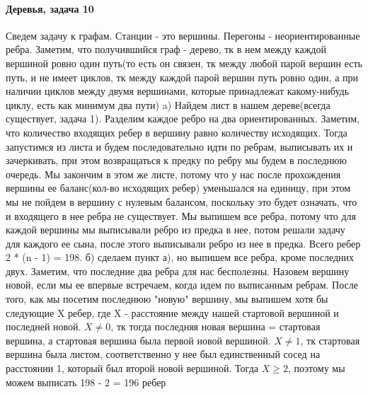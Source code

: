 \documentclass{article}
\begin{document}
	\paragraph{Деревья, задача 10}
	\hspace{\fill} \newline
	Сведем задачу к графам. Станции - это вершины. Перегоны - неориентированные ребра. Заметим, что получившийся граф - дерево, тк в нем между каждой вершиной ровно один путь(то есть он связен, тк между любой парой вершин есть путь, и не имеет циклов, тк между каждой парой вершин путь ровно один, а при наличии циклов между двумя вершинами, которые принадлежат какому-нибудь циклу, есть как минимум два пути)
	\newline
	a) Найдем лист в нашем дереве(всегда существует, задача 1). Разделим каждое ребро на два ориентированных. Заметим, что количество входящих ребер в вершину равно количеству исходящих. Тогда запустимся из листа и будем последовательно идти по ребрам, выписывать их и зачеркивать, при этом возвращаться к предку по ребру мы будем в последнюю очередь. Мы закончим в этом же листе, потому что у нас после прохождения вершины ее баланс(кол-во исходящих ребер) уменьшался на единицу, при этом мы не пойдем в вершину с нулевым балансом, поскольку это будет означать, что и входящего в нее ребра не существует. Мы выпишем все ребра, потому что для каждой вершины мы выписывали ребро из предка в нее, потом решали задачу для каждого ее сына, после этого выписывали ребро из нее в предка. Всего ребер 2 * (n - 1) = 198.
	\newline
	б) сделаем пункт а), но выпишем все ребра, кроме последних двух. Заметим, что последние два ребра для нас бесполезны. Назовем вершину новой, если мы ее впервые встречаем, когда идем по выписанным ребрам. После того, как мы посетим последнюю "новую" вершину, мы выпишем хотя бы следующие X ребер, где X - расстояние между нашей стартовой вершиной и последней новой. 
\newline
	$X \neq 0$, тк тогда последняя новая вершина = стартовая вершина, а стартовая вершина была первой новой вершиной. 
\newline
	$ X \neq 1$, тк стартовая вершина была листом, соответственно у нее был единственный сосед на расстоянии 1, который был второй новой вершиной.
	\newline
	Тогда $X \geq 2$, поэтому мы можем выписать 198 - 2 = 196 ребер
\end{document}
